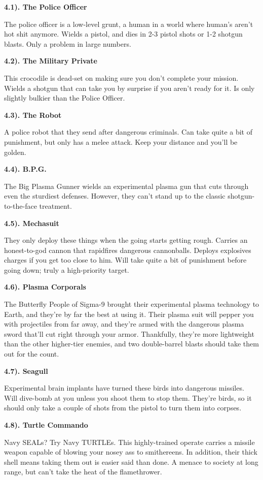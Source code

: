 \documentclass[12pt]{article}
\begin{document}
\begin{flushleft}
\textbf{4.1). The Police Officer}

The police officer is a low-level grunt, a human in a world where human's aren't hot shit anymore. Wields a pistol, and dies in 2-3 pistol shots or 1-2 shotgun blasts. Only a problem in large numbers.

\textbf{4.2). The Military Private}

This crocodile is dead-set on making sure you don't complete your mission. Wields a shotgun that can take you by surprise if you aren't ready for it. Is only slightly bulkier than the Police Officer.

\textbf{4.3). The Robot}

A police robot that they send after dangerous criminals. Can take quite a bit of punishment, but only has a melee attack. Keep your distance and you'll be golden.

\textbf{4.4). B.P.G.}

The Big Plasma Gunner wields an experimental plasma gun that cuts through even the sturdiest defenses. However, they can't stand up to the classic shotgun-to-the-face treatment.

\textbf{4.5). Mechasuit}

They only deploy these things when the going starts getting rough. Carries an honest-to-god cannon that rapidfires dangerous cannonballs. Deploys explosives charges if you get too close to him. Will take quite a bit of punishment before going down; truly a high-priority target.

\textbf{4.6). Plasma Corporals}

The Butterfly People of Sigma-9 brought their experimental plasma technology to Earth, and they're by far the best at using it. Their plasma suit will pepper you with projectiles from far away, and they're armed with the dangerous plasma sword that'll cut right through your armor. Thankfully, they're more lightweight than the other higher-tier enemies, and two double-barrel blasts should take them out for the count.

\textbf{4.7). Seagull}

Experimental brain implants have turned these birds into dangerous missiles. Will dive-bomb at you unless you shoot them to stop them. They're birds, so it should only take a couple of shots from the pistol to turn them into corpses.

\textbf{4.8). Turtle Commando}

Navy SEALs? Try Navy TURTLEs. This highly-trained operate carries a missile weapon capable of blowing your nosey ass to smithereens. In addition, their thick shell means taking them out is easier said than done. A menace to society at long range, but can't take the heat of the flamethrower.


\end{flushleft}
\end{document}
